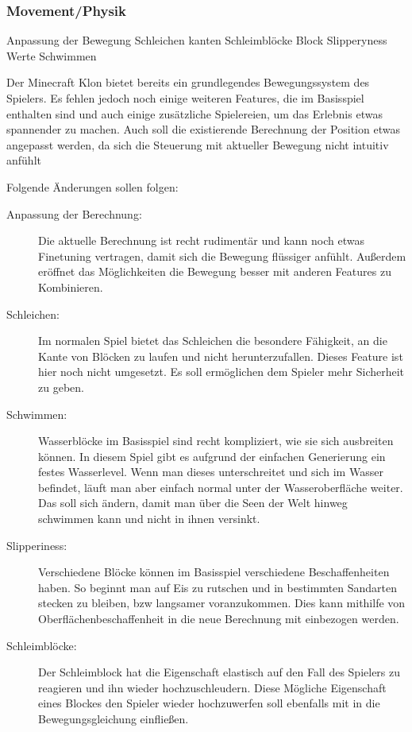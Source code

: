 \documentclass{article}
\begin{document}
\subsubsection{Movement/Physik}

Anpassung der Bewegung
Schleichen kanten
Schleimblöcke
Block Slipperyness Werte
Schwimmen

Der Minecraft Klon bietet bereits ein grundlegendes Bewegungssystem des Spielers. Es fehlen jedoch noch einige weiteren Features, die im Basisspiel enthalten sind und auch einige zusätzliche Spielereien, um das Erlebnis etwas spannender zu machen. Auch soll die existierende Berechnung der Position etwas angepasst werden, da sich die Steuerung mit aktueller Bewegung nicht intuitiv anfühlt

Folgende Änderungen sollen folgen:

\begin{description}
  \item[Anpassung der Berechnung:] Die aktuelle Berechnung ist recht rudimentär und kann noch etwas Finetuning vertragen, damit sich die Bewegung flüssiger anfühlt. Au\ss{}erdem eröffnet das Möglichkeiten die Bewegung besser mit anderen Features zu Kombinieren.
  \item[Schleichen:] Im normalen Spiel bietet das Schleichen die besondere Fähigkeit, an die Kante von Blöcken zu laufen und nicht herunterzufallen. Dieses Feature ist hier noch nicht umgesetzt. Es soll ermöglichen dem Spieler mehr Sicherheit zu geben.
  \item[Schwimmen:] Wasserblöcke im Basisspiel sind recht kompliziert, wie sie sich ausbreiten können. In diesem Spiel gibt es aufgrund der einfachen Generierung ein festes Wasserlevel. Wenn man dieses unterschreitet und sich im Wasser befindet, läuft man aber einfach normal unter der Wasseroberfläche weiter. Das soll sich ändern, damit man über die Seen der Welt hinweg schwimmen kann und nicht in ihnen versinkt.
  \item[Slipperiness:] Verschiedene Blöcke können im Basisspiel verschiedene Beschaffenheiten haben. So beginnt man auf Eis zu rutschen und in bestimmten Sandarten stecken zu bleiben, bzw langsamer voranzukommen. Dies kann mithilfe von Oberflächenbeschaffenheit in die neue Berechnung mit einbezogen werden.
  \item[Schleimblöcke:] Der Schleimblock hat die Eigenschaft elastisch auf den Fall des Spielers zu reagieren und ihn wieder hochzuschleudern. Diese Mögliche Eigenschaft eines Blockes den Spieler wieder hochzuwerfen soll ebenfalls mit in die Bewegungsgleichung einflie\ss{}en.
\end{description}
\end{document}
